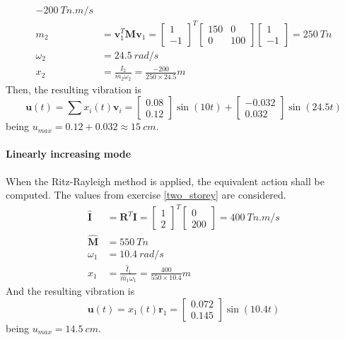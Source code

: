 \begin{Answer}[ref={two_storey_helicopter}]
\begin{align*}
    \SI{-200}{Tn.m/s} \\
    m_2 &= \mathbf{v}_1^T\mathbf{M}\mathbf{v}_1 =
    \begin{bmatrix}1 \\ -1\end{bmatrix}^T \begin{bmatrix}150 & 0 \\ 0 & 100\end{bmatrix} \begin{bmatrix}1 \\ -1\end{bmatrix} =
    \SI{250}{Tn} \\
    \omega_2 &= \SI{24.5}{rad/s} \\
    x_2 &= \frac{I_2}{m_2\omega_2} = \frac{-200}{250\times24.5} \si{m}
\end{align*}
Then, the resulting vibration is
$$
\mathbf{u}(t) = \sum x_i(t)\mathbf{v}_i =
\begin{bmatrix}0.08 \\ 0.12\end{bmatrix} \sin(10t) +
\begin{bmatrix}-0.032 \\ 0.032\end{bmatrix} \sin(24.5t)
$$
being $u_{max} = 0.12 + 0.032 \approx \SI{15}{cm}$.


\paragraph{Linearly increasing mode}
When the Ritz-Rayleigh method is applied, the equivalent action shall be computed. The values from exercise \ref{two_storey} are considered.
\begin{align*}
    \hat{\mathbf{I}} &= \mathbf{R}^T\mathbf{I} =
    \begin{bmatrix}1 \\ 2\end{bmatrix}^T \begin{bmatrix}0 \\ 200\end{bmatrix} =
    \SI{400}{Tn.m/s} \\
    \hat{\mathbf{M}} &= \SI{550}{Tn} \\
    \omega_1 &= \SI{10.4}{rad/s} \\
    x_1 &= \frac{\hat{I}_1}{\hat{m}_1\omega_1} = \frac{400}{550\times10.4} \si{m}
\end{align*}
And the resulting vibration is
$$
\mathbf{u}(t) = x_1(t)\mathbf{r}_1 =
\begin{bmatrix}0.072 \\ 0.145\end{bmatrix} \sin(10.4t)
$$
being $u_{max} = \SI{14.5}{cm}$.

\end{Answer}
